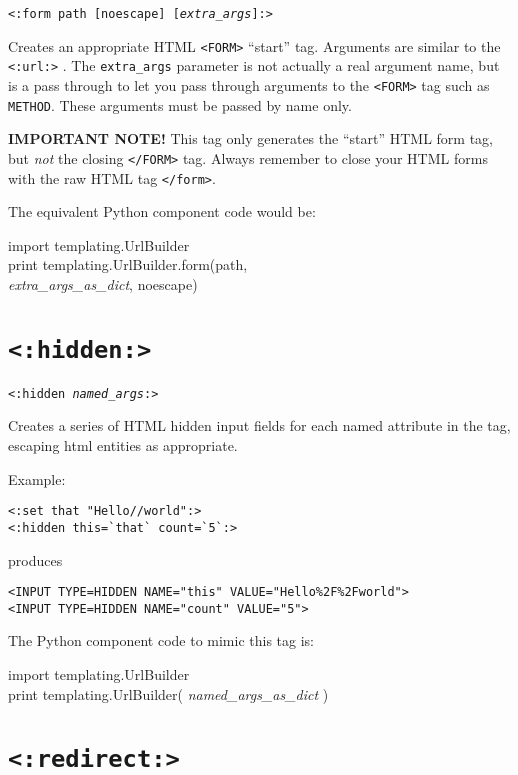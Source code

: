 \documentclass{manual}
\begin{document}
{{\texttt{<:form path [noescape] [\emph{extra_args}]:>}

Creates an appropriate HTML \texttt{<FORM>} ``start'' tag. 
Arguments are similar to the \texttt{<:url:>} .
The \texttt{extra_args} parameter is not actually a real argument name, but
is a pass through to let you pass through arguments to the
\texttt{<FORM>} 
tag such as \texttt{METHOD}. These arguments must be passed by name only.

\textbf{IMPORTANT NOTE!} This tag only generates the ``start'' HTML
form tag, but \emph{not} the closing \texttt{</FORM>} tag.
Always remember to close your HTML forms with the raw HTML tag
\texttt{</form>}.

The equivalent Python component code would be:
\begin{obeylines}\ttfamily
import templating.UrlBuilder
print templating.UrlBuilder.form(path,
     \textit{extra_args_as_dict}, noescape)
\end{obeylines}


\section{\texttt{<:hidden:>}}
\label{taghidden}

\texttt{<:hidden \emph{named_args}:>}

Creates a series of HTML hidden input fields for each named attribute
in the tag, escaping html entities as appropriate.

Example:

\begin{verbatim}
<:set that "Hello//world":>
<:hidden this=`that` count=`5`:>
\end{verbatim}

produces

\begin{verbatim}
<INPUT TYPE=HIDDEN NAME="this" VALUE="Hello%2F%2Fworld">
<INPUT TYPE=HIDDEN NAME="count" VALUE="5">
\end{verbatim}


The Python component code to mimic this tag is:
\begin{obeylines}\ttfamily
import templating.UrlBuilder
print templating.UrlBuilder( \emph{named_args_as_dict} )
\end{obeylines}

\section{\texttt{<:redirect:>}}
\label{tagredirect}

}}
\end{document}

